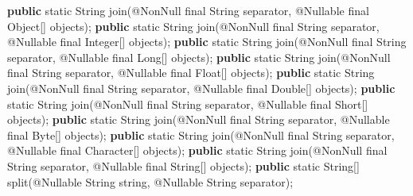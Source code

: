 \documentclass[
]{book}
\newenvironment{Shaded}{\begin{snugshade}}{\end{snugshade}}
\newcommand{\AttributeTok}[1]{\textcolor[rgb]{0.77,0.63,0.00}{#1}}
\newcommand{\BuiltInTok}[1]{#1}
\newcommand{\DataTypeTok}[1]{\textcolor[rgb]{0.13,0.29,0.53}{#1}}
\newcommand{\FunctionTok}[1]{\textcolor[rgb]{0.00,0.00,0.00}{#1}}
\newcommand{\KeywordTok}[1]{\textcolor[rgb]{0.13,0.29,0.53}{\textbf{#1}}}
\newcommand{\NormalTok}[1]{#1}
\begin{document}
\begin{Shaded}
\begin{Highlighting}[]
\KeywordTok{public} \DataTypeTok{static} \BuiltInTok{String} \FunctionTok{join}\NormalTok{(}\AttributeTok{@NonNull} \DataTypeTok{final} \BuiltInTok{String}\NormalTok{ separator, }\AttributeTok{@Nullable} \DataTypeTok{final} \BuiltInTok{Object}\NormalTok{[] objects);}
\KeywordTok{public} \DataTypeTok{static} \BuiltInTok{String} \FunctionTok{join}\NormalTok{(}\AttributeTok{@NonNull} \DataTypeTok{final} \BuiltInTok{String}\NormalTok{ separator, }\AttributeTok{@Nullable} \DataTypeTok{final} \BuiltInTok{Integer}\NormalTok{[] objects);}
\KeywordTok{public} \DataTypeTok{static} \BuiltInTok{String} \FunctionTok{join}\NormalTok{(}\AttributeTok{@NonNull} \DataTypeTok{final} \BuiltInTok{String}\NormalTok{ separator, }\AttributeTok{@Nullable} \DataTypeTok{final} \BuiltInTok{Long}\NormalTok{[] objects);}
\KeywordTok{public} \DataTypeTok{static} \BuiltInTok{String} \FunctionTok{join}\NormalTok{(}\AttributeTok{@NonNull} \DataTypeTok{final} \BuiltInTok{String}\NormalTok{ separator, }\AttributeTok{@Nullable} \DataTypeTok{final} \BuiltInTok{Float}\NormalTok{[] objects);}
\KeywordTok{public} \DataTypeTok{static} \BuiltInTok{String} \FunctionTok{join}\NormalTok{(}\AttributeTok{@NonNull} \DataTypeTok{final} \BuiltInTok{String}\NormalTok{ separator, }\AttributeTok{@Nullable} \DataTypeTok{final} \BuiltInTok{Double}\NormalTok{[] objects);}
\KeywordTok{public} \DataTypeTok{static} \BuiltInTok{String} \FunctionTok{join}\NormalTok{(}\AttributeTok{@NonNull} \DataTypeTok{final} \BuiltInTok{String}\NormalTok{ separator, }\AttributeTok{@Nullable} \DataTypeTok{final} \BuiltInTok{Short}\NormalTok{[] objects);}
\KeywordTok{public} \DataTypeTok{static} \BuiltInTok{String} \FunctionTok{join}\NormalTok{(}\AttributeTok{@NonNull} \DataTypeTok{final} \BuiltInTok{String}\NormalTok{ separator, }\AttributeTok{@Nullable} \DataTypeTok{final} \BuiltInTok{Byte}\NormalTok{[] objects);}
\KeywordTok{public} \DataTypeTok{static} \BuiltInTok{String} \FunctionTok{join}\NormalTok{(}\AttributeTok{@NonNull} \DataTypeTok{final} \BuiltInTok{String}\NormalTok{ separator, }\AttributeTok{@Nullable} \DataTypeTok{final} \BuiltInTok{Character}\NormalTok{[] objects);}
\KeywordTok{public} \DataTypeTok{static} \BuiltInTok{String} \FunctionTok{join}\NormalTok{(}\AttributeTok{@NonNull} \DataTypeTok{final} \BuiltInTok{String}\NormalTok{ separator, }\AttributeTok{@Nullable} \DataTypeTok{final} \BuiltInTok{String}\NormalTok{[] objects);}
\KeywordTok{public} \DataTypeTok{static} \BuiltInTok{String}\NormalTok{[] }\FunctionTok{split}\NormalTok{(}\AttributeTok{@Nullable} \BuiltInTok{String}\NormalTok{ string, }\AttributeTok{@Nullable} \BuiltInTok{String}\NormalTok{ separator);}

\end{Highlighting}
\end{Shaded}
\end{document}
